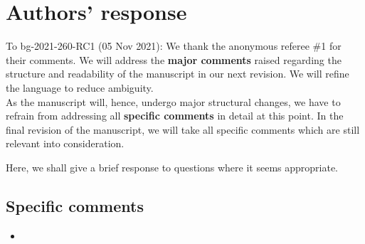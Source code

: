 \documentclass{scrartcl}
\begin{document}
\section*{Authors' response}
To bg-2021-260-RC1 (05 Nov 2021):
We thank the anonymous referee \#1 for their comments.
We will address the \textbf{major comments} raised regarding the structure and readability of the manuscript in our next revision. We will refine the language to reduce ambiguity.\\
As the manuscript will, hence, undergo major structural changes, we have to refrain from addressing all \textbf{specific comments} in detail at this point. In the final revision of the manuscript, we will take all specific comments which are still relevant into consideration. 

Here, we shall give a brief response to questions where it seems appropriate.

\subsection*{Specific comments} 
\begin{itemize}
    
    \item {\color{blue} }

\end{itemize}
\end{document}
